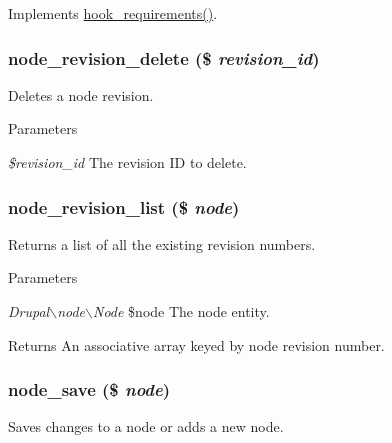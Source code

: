 \label{node_8module_a69330298fa1d167f0cfaec1cea81f0dd}
Implements \hyperlink{group__hooks_ga3cff06c700ccb873cfce71fc378e7675}{hook\_\-requirements()}. \hypertarget{node_8module_a0f00bdfa980e632ef1346027b9064b37}{
\subsubsection[{node\_\-revision\_\-delete}]{\setlength{\rightskip}{0pt plus 5cm}node\_\-revision\_\-delete (\$ {\em revision\_\-id})}}
\label{node_8module_a0f00bdfa980e632ef1346027b9064b37}
Deletes a node revision.


\begin{DoxyParams}{Parameters}
\item[{\em \$revision\_\-id}]The revision ID to delete. \end{DoxyParams}
\hypertarget{node_8module_a50640e4f9b25dcdd939524cd57271fae}{
\subsubsection[{node\_\-revision\_\-list}]{\setlength{\rightskip}{0pt plus 5cm}node\_\-revision\_\-list (\$ {\em node})}}
\label{node_8module_a50640e4f9b25dcdd939524cd57271fae}
Returns a list of all the existing revision numbers.


\begin{DoxyParams}{Parameters}
\item[{\em Drupal$\backslash$node$\backslash$Node}]\$node The node entity.\end{DoxyParams}
\begin{DoxyReturn}{Returns}
An associative array keyed by node revision number. 
\end{DoxyReturn}
\hypertarget{node_8module_a26add7591be64b30a18232927ef14faf}{
\subsubsection[{node\_\-save}]{\setlength{\rightskip}{0pt plus 5cm}node\_\-save (\$ {\em node})}}
\label{node_8module_a26add7591be64b30a18232927ef14faf}
Saves changes to a node or adds a new node.


